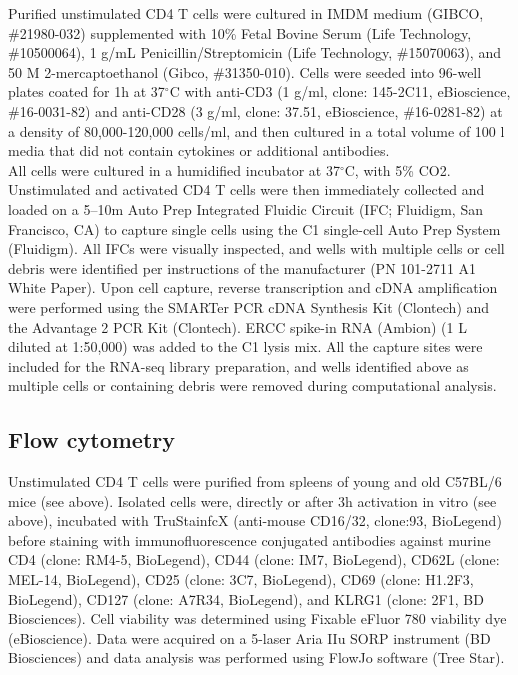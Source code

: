 Purified unstimulated CD4\plus{} T cells were cultured in IMDM medium (GIBCO, \#{}21980-032) supplemented with 10\% Fetal Bovine Serum (Life Technology, \#{}10500064), 1 \textmu{}g/mL Penicillin/Streptomicin (Life Technology, \#{}15070063), and 50 \textmu{}M 2-mercaptoethanol (Gibco, \#{}31350-010). Cells were seeded into 96-well plates coated for 1h at 37$^\circ$C with anti-CD3\textepsilon{} (1 \textmu{}g/ml, clone: 145-2C11, eBioscience, \#{}16-0031-82) and anti-CD28 (3 \textmu{}g/ml, clone: 37.51, eBioscience, \#{}16-0281-82) at a density of 80,000-120,000 cells/ml, and then cultured in a total volume of 100 \textmu{}l media that did not contain cytokines or additional antibodies.  \\

All cells were cultured in a humidified incubator at 37$^\circ$C, with 5\% CO2. Unstimulated and activated CD4\plus{} T cells were then immediately collected and loaded on a 5–10\textmu{}m Auto Prep Integrated Fluidic Circuit (IFC; Fluidigm, San Francisco, CA) to capture single cells using the C1 single-cell Auto Prep System (Fluidigm). All IFCs were visually inspected, and wells with multiple cells or cell debris were identified per instructions of the manufacturer (PN 101-2711 A1 White Paper). Upon cell capture, reverse transcription and cDNA amplification were performed using the SMARTer PCR cDNA Synthesis Kit (Clontech) and the Advantage 2 PCR Kit (Clontech). ERCC spike-in RNA (Ambion) (1 \textmu{}L diluted at 1:50,000) was added to the C1 lysis mix. All the capture sites were included for the RNA-seq library preparation, and wells identified above as multiple cells or containing debris were removed during computational analysis.

\subsection{Flow cytometry}
\label{appA.1:FACS}

Unstimulated CD4\plus{} T cells were purified from spleens of young and old C57BL/6 mice (see above). Isolated cells were, directly or after 3h activation in vitro (see above), incubated with TruStainfcX (anti-mouse CD16/32, clone:93, BioLegend) before staining with immunofluorescence conjugated antibodies against murine CD4 (clone: RM4-5, BioLegend), CD44 (clone: IM7, BioLegend), CD62L (clone: MEL-14, BioLegend), CD25 (clone: 3C7, BioLegend), CD69 (clone: H1.2F3, BioLegend), CD127 (clone: A7R34, BioLegend), and KLRG1 (clone: 2F1, BD Biosciences). Cell viability was determined using Fixable eFluor 780 viability dye (eBioscience). Data were acquired on a 5-laser Aria IIu SORP instrument (BD Biosciences) and data analysis was performed using FlowJo software (Tree Star).\\

